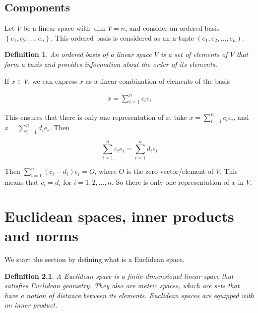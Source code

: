 \documentclass{book}
\newtheorem{definition}{Definition}[chapter]
\begin{document}
\section{Components}

Let $V$ be a linear space with $\dim V = n$, and consider an ordered basis
$\left\{e_1, e_2,\dots,e_n\right\}$. This ordered basis is considered as an
n-tuple $\left(e_1,e_2,\dots,e_n\right)$.

\begin{definition}
    An ordered basis of a linear space $V$ is a set of elements of $V$ that form a basis and provides information
    about the order of its elements.
\end{definition}

If $x\in V$, we can express $x$ as a linear combination of elements of the
basis

\begin{equation}
    \begin{split}
        x=\sum_{i=1}^{n}{c_i e_i}
    \end{split}
\end{equation}

This ensures that there is only one representation of $x$, take $x =
    \sum_{i=1}^{n}{c_i e_i}$, and $x = \sum_{i=1}^{n}{d_i e_i}$. Then

\[
    \sum_{i=1}^{n}{c_i e_i} = \sum_{i=1}^{n}{d_i e_i}
\]

Then $\sum_{i=1}^{n}{(c_i - d_i) e_i} = O$, where $O$ is the zero
vector/element of $V$. This means that $c_i=d_i$ for $i=1,2,\dots,n$. So there
is only one representation of $x$ in $V$.

\chapter{Euclidean spaces, inner products and norms}

We start the section by defining what is a Euclidean space.

\begin{definition}
    A \textit{Euclidean space} is a finite-dimensional linear space that satisfies
    Euclidean geometry. They also are metric spaces, which are sets that have a notion
    of distance between its elements. Euclidean spaces are equipped with an \textit{inner product}.
\end{definition}
\end{document}
